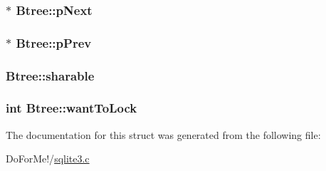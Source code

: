 \hypertarget{struct_btree_a9e6d2ca44c10ed8ef0be004225a74ef5}{
\subsubsection[{p\-Next}]{$\ast$ Btree\-::p\-Next}}\label{struct_btree_a9e6d2ca44c10ed8ef0be004225a74ef5}
\hypertarget{struct_btree_a0423f1c55c1fe6812161a49bb2bf604f}{
\subsubsection[{p\-Prev}]{$\ast$ Btree\-::p\-Prev}}\label{struct_btree_a0423f1c55c1fe6812161a49bb2bf604f}
\hypertarget{struct_btree_a114f157127c76a1fbad8292e4b39c4dd}{
\subsubsection[{sharable}]{ Btree\-::sharable}}\label{struct_btree_a114f157127c76a1fbad8292e4b39c4dd}
\hypertarget{struct_btree_a97368ea300f0b74b8e80ea07da0cea2a}{
\subsubsection[{want\-To\-Lock}]{\setlength{\rightskip}{0pt plus 5cm}int Btree\-::want\-To\-Lock}}\label{struct_btree_a97368ea300f0b74b8e80ea07da0cea2a}


The documentation for this struct was generated from the following file\-:\begin{DoxyCompactItemize}
\item 
Do\-For\-Me!/\hyperlink{sqlite3_8c}{sqlite3.\-c}\end{DoxyCompactItemize}
